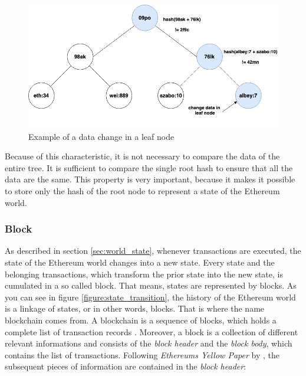 \begin{figure}[htbp]
	\centering
	\includegraphics[width=.75\linewidth]{./figures/merkle_tree_change.png}
	\caption{Example of a data change in a leaf node}
	\label{figure:merkle_tree_change}
\end{figure}

Because of this characteristic, it is not necessary to compare the data of the entire tree. It is sufficient to compare the single root hash to ensure that all the data are the same. This property is very important, because it makes it possible to store only the hash of the root node to represent a state of the Ethereum world. 

\subsubsection{Block} 
\label{sec:block}
As described in section \ref{sec:world_state}, whenever transactions are executed, the state of the Ethereum world changes into a new state. Every state and the belonging transactions, which transform the prior state into the new state, is cumulated in a so called block. That means, states are represented by blocks. As you can see in figure \ref{figure:state_transition}, the history of the Ethereum world is a linkage of states, or in other words, blocks. That is where the name blockchain comes from. A blockchain is a sequence of blocks, which holds a complete list of transaction records . 
Moreover, a block is a collection of different relevant informations and consists of the \textit{block header} and the \textit{block body}, which contains the list of transactions. Following \textit{Ethereums Yellow Paper} by , the subsequent pieces of information are contained in the \textit{block header}:

